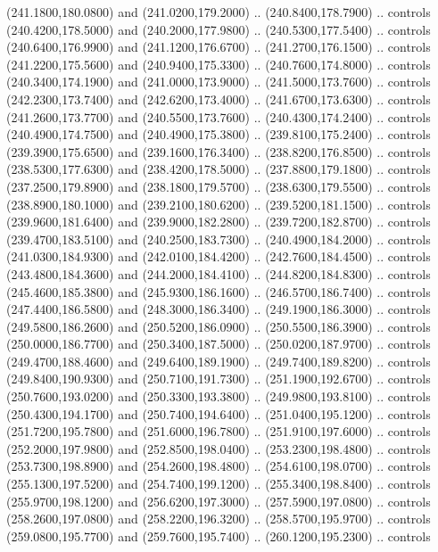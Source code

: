 {\begin{scope}[y=0.80pt, x=0.80pt, yscale=-1, xscale=1, inner sep=0pt, outer sep=0pt, #1]
      (241.1800,180.0800) and (241.0200,179.2000) .. (240.8400,178.7900) .. controls
      (240.4200,178.5000) and (240.2000,177.9800) .. (240.5300,177.5400) .. controls
      (240.6400,176.9900) and (241.1200,176.6700) .. (241.2700,176.1500) .. controls
      (241.2200,175.5600) and (240.9400,175.3300) .. (240.7600,174.8000) .. controls
      (240.3400,174.1900) and (241.0000,173.9000) .. (241.5000,173.7600) .. controls
      (242.2300,173.7400) and (242.6200,173.4000) .. (241.6700,173.6300) .. controls
      (241.2600,173.7700) and (240.5500,173.7600) .. (240.4300,174.2400) .. controls
      (240.4900,174.7500) and (240.4900,175.3800) .. (239.8100,175.2400) .. controls
      (239.3900,175.6500) and (239.1600,176.3400) .. (238.8200,176.8500) .. controls
      (238.5300,177.6300) and (238.4200,178.5000) .. (237.8800,179.1800) .. controls
      (237.2500,179.8900) and (238.1800,179.5700) .. (238.6300,179.5500) .. controls
      (238.8900,180.1000) and (239.2100,180.6200) .. (239.5200,181.1500) .. controls
      (239.9600,181.6400) and (239.9000,182.2800) .. (239.7200,182.8700) .. controls
      (239.4700,183.5100) and (240.2500,183.7300) .. (240.4900,184.2000) .. controls
      (241.0300,184.9300) and (242.0100,184.4200) .. (242.7600,184.4500) .. controls
      (243.4800,184.3600) and (244.2000,184.4100) .. (244.8200,184.8300) .. controls
      (245.4600,185.3800) and (245.9300,186.1600) .. (246.5700,186.7400) .. controls
      (247.4400,186.5800) and (248.3000,186.3400) .. (249.1900,186.3000) .. controls
      (249.5800,186.2600) and (250.5200,186.0900) .. (250.5500,186.3900) .. controls
      (250.0000,186.7700) and (250.3400,187.5000) .. (250.0200,187.9700) .. controls
      (249.4700,188.4600) and (249.6400,189.1900) .. (249.7400,189.8200) .. controls
      (249.8400,190.9300) and (250.7100,191.7300) .. (251.1900,192.6700) .. controls
      (250.7600,193.0200) and (250.3300,193.3800) .. (249.9800,193.8100) .. controls
      (250.4300,194.1700) and (250.7400,194.6400) .. (251.0400,195.1200) .. controls
      (251.7200,195.7800) and (251.6000,196.7800) .. (251.9100,197.6000) .. controls
      (252.2000,197.9800) and (252.8500,198.0400) .. (253.2300,198.4800) .. controls
      (253.7300,198.8900) and (254.2600,198.4800) .. (254.6100,198.0700) .. controls
      (255.1300,197.5200) and (254.7400,199.1200) .. (255.3400,198.8400) .. controls
      (255.9700,198.1200) and (256.6200,197.3000) .. (257.5900,197.0800) .. controls
      (258.2600,197.0800) and (258.2200,196.3200) .. (258.5700,195.9700) .. controls
      (259.0800,195.7700) and (259.7600,195.7400) .. (260.1200,195.2300) .. controls

\end{scope}}
